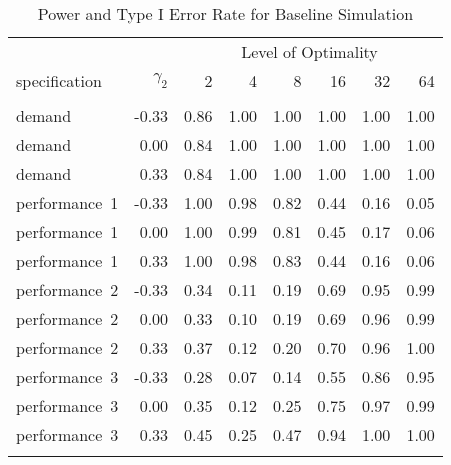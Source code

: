 \begin{table}

\caption{\label{tab:main-table}Power and Type I Error Rate for Baseline Simulation}
\centering
\fontsize{9}{11}\selectfont
\begin{threeparttable}
\begin{tabular}[t]{lrrrrrrr}
\toprule
\multicolumn{1}{c}{ } & \multicolumn{1}{c}{ } & \multicolumn{6}{c}{Level of Optimality} \\
\cmidrule(l{3pt}r{3pt}){3-8}
specification & $\gamma_2$ & 2 & 4 & 8 & 16 & 32 & 64\\
\midrule
\addlinespace[0.3em]
\multicolumn{8}{c}{\textbf{Power}}\\
\hspace{1em}demand & -0.33 & 0.86 & 1.00 & 1.00 & 1.00 & 1.00 & 1.00\\
\hspace{1em}demand & 0.00 & 0.84 & 1.00 & 1.00 & 1.00 & 1.00 & 1.00\\
\hspace{1em}demand & 0.33 & 0.84 & 1.00 & 1.00 & 1.00 & 1.00 & 1.00\\
\hspace{1em}performance~1 & -0.33 & 1.00 & 0.98 & 0.82 & 0.44 & 0.16 & 0.05\\
\hspace{1em}performance~1 & 0.00 & 1.00 & 0.99 & 0.81 & 0.45 & 0.17 & 0.06\\
\hspace{1em}performance~1 & 0.33 & 1.00 & 0.98 & 0.83 & 0.44 & 0.16 & 0.06\\
\hspace{1em}performance~2 & -0.33 & 0.34 & 0.11 & 0.19 & 0.69 & 0.95 & 0.99\\
\hspace{1em}performance~2 & 0.00 & 0.33 & 0.10 & 0.19 & 0.69 & 0.96 & 0.99\\
\hspace{1em}performance~2 & 0.33 & 0.37 & 0.12 & 0.20 & 0.70 & 0.96 & 1.00\\
\hspace{1em}performance~3 & -0.33 & 0.28 & 0.07 & 0.14 & 0.55 & 0.86 & 0.95\\
\hspace{1em}performance~3 & 0.00 & 0.35 & 0.12 & 0.25 & 0.75 & 0.97 & 0.99\\
\hspace{1em}performance~3 & 0.33 & 0.45 & 0.25 & 0.47 & 0.94 & 1.00 & 1.00\\
\addlinespace[0.3em]

\end{tabular}
\end{threeparttable}
\end{table}
